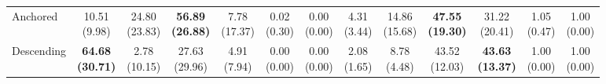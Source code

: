 {\begin{tabular}{l|cccccc|cccccc}
Anchored & \makecell{10.51 \\ (9.98)} & \makecell{24.80 \\ (23.83)} & {\cellcolor[HTML]{C8E6C9}} \bfseries \makecell{56.89 \\ (26.88)} & \makecell{7.78 \\ (17.37)} & \makecell{0.02 \\ (0.30)} & \makecell{0.00 \\ (0.00)} & \makecell{4.31 \\ (3.44)} & \makecell{14.86 \\ (15.68)} & {\cellcolor[HTML]{C8E6C9}} \bfseries \makecell{47.55 \\ (19.30)} & \makecell{31.22 \\ (20.41)} & \makecell{1.05 \\ (0.47)} & \makecell{1.00 \\ (0.00)} \\
Descending & \bfseries \makecell{64.68 \\ (30.71)} & \makecell{2.78 \\ (10.15)} & {\cellcolor[HTML]{C8E6C9}} \makecell{27.63 \\ (29.96)} & \makecell{4.91 \\ (7.94)} & \makecell{0.00 \\ (0.00)} & \makecell{0.00 \\ (0.00)} & \makecell{2.08 \\ (1.65)} & \makecell{8.78 \\ (4.48)} & {\cellcolor[HTML]{C8E6C9}} \makecell{43.52 \\ (12.03)} & \bfseries \makecell{43.63 \\ (13.37)} & \makecell{1.00 \\ (0.00)} & \makecell{1.00 \\ (0.00)} \\
\bottomrule
\end{tabular}
}%
